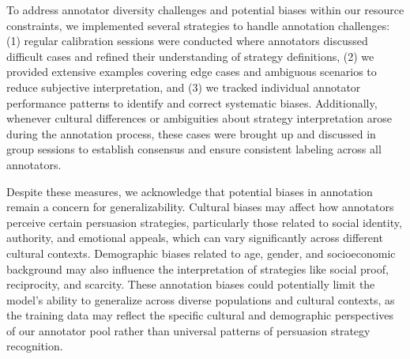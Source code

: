 To address annotator diversity challenges and potential biases within our resource constraints, we implemented several strategies to handle annotation challenges: (1) regular calibration sessions were conducted where annotators discussed difficult cases and refined their understanding of strategy definitions, (2) we provided extensive examples covering edge cases and ambiguous scenarios to reduce subjective interpretation, and (3) we tracked individual annotator performance patterns to identify and correct systematic biases. Additionally, whenever cultural differences or ambiguities about strategy interpretation arose during the annotation process, these cases were brought up and discussed in group sessions to establish consensus and ensure consistent labeling across all annotators. 

Despite these measures, we acknowledge that potential biases in annotation remain a concern for generalizability. Cultural biases may affect how annotators perceive certain persuasion strategies, particularly those related to social identity, authority, and emotional appeals, which can vary significantly across different cultural contexts. Demographic biases related to age, gender, and socioeconomic background may also influence the interpretation of strategies like social proof, reciprocity, and scarcity. These annotation biases could potentially limit the model's ability to generalize across diverse populations and cultural contexts, as the training data may reflect the specific cultural and demographic perspectives of our annotator pool rather than universal patterns of persuasion strategy recognition.


